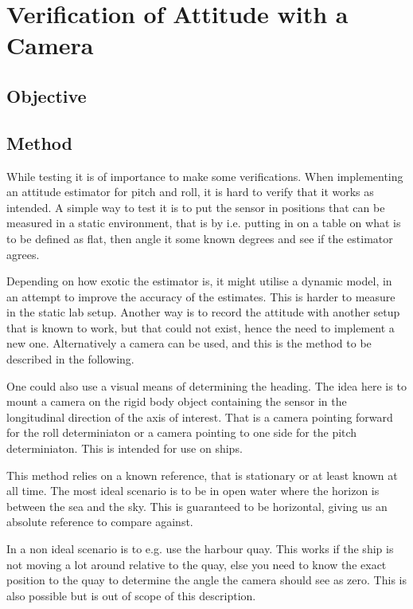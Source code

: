 \chapter{Verification of Attitude with a Camera}

\section{Objective}
\section{Method}


While testing it is of importance to make some verifications. When implementing an attitude
estimator for pitch and roll, it is hard to verify that it works as
intended. A simple way to test it is to put the sensor in positions
that can be measured in a static environment, that is by i.e. putting
in on a table on what is to be defined as flat, then angle it
some known degrees and see if the estimator agrees.

Depending on how exotic the estimator is, it might utilise a dynamic
model, in an attempt to improve the accuracy of the estimates. This is
harder to measure in the static lab setup. Another way is to record
the attitude with another setup that is known to work, but that could
not exist, hence the need to implement a new one. Alternatively a
camera can be used, and this is the method to be described in the
following.

One could also use a visual means of determining the heading. The idea
here is to mount a camera on the rigid body object containing the
sensor in the longitudinal direction of the axis of interest. That is
a camera pointing forward for the roll determiniaton or a camera
pointing to one side for the pitch determiniaton. This is intended for
use on ships.

This method relies on a known reference, that is stationary or at least
known at all time. The most ideal scenario is to be in open water
where the horizon is between the sea and the sky. This is guaranteed
to be horizontal, giving us an absolute reference to compare against.

In a non ideal scenario is to e.g. use the harbour quay. This works if
the ship is not moving a lot around relative to the quay, else you
need to know the exact position to the quay to determine the angle the
camera should see as zero. This is also possible but is out of scope
of this description.

